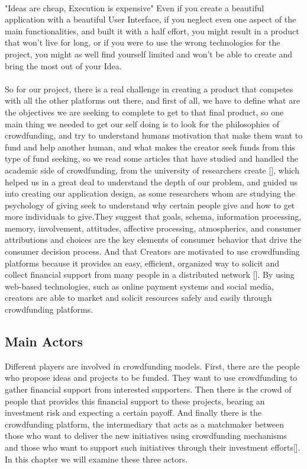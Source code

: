 \paragraph*{}
"Ideas are cheap, Execution is expensive" Even if you create a beautiful application with a beautiful User Interface, if you neglect even one aspect of the main functionalities, and built it with a half effort, you might result in a product that won't live for long, or if you were to use the wrong technologies for the project, you might as well find yourself limited and won't be able to create and bring the most out of your Idea.
\paragraph*{}
So for our project, there is a real challenge in creating a product that competes with all the other platforms out there,
and first of all, we have to define what are the objectives we are seeking to complete to get to that final product,
so one main thing we needed to get our self doing is to look for the philosophies of crowdfunding, and try to understand humans motivation that make them want to fund and help another human, and what makes the creator seek funds from this type of fund seeking,
so we read some articles that have studied and handled the academic side of crowdfunding, from the university of  researchers create [\cite{inproceedings}], which helped us in a great deal to understand the depth of our problem, and guided us into creating our application design, as some researchers whom are studying the psychology of giving seek to understand why certain people give and how to get more individuals to give.They suggest that goals, schema, information processing, memory, involvement, attitudes, affective processing, atmospherics, and consumer attributions and choices are the key elements of consumer behavior that drive the consumer decision process.
And that Creators are motivated to use crowdfunding platforms because it provides an easy, efficient, organized way to solicit and collect financial support from many people in a distributed network [\cite{crowdMotiv}]. By using web-based technologies, such as online payment systems and social media, creators are able to market and solicit resources safely and easily through crowdfunding platforms.
\\
\subsection{Main Actors}
Different players are involved in crowdfunding models. First, there are the people who propose ideas and
projects to be funded. They want to use crowdfunding to gather financial support from interested supporters.
Then there is the crowd of people that provides this financial support to these projects, bearing an investment
risk and expecting a certain payoff. And finally there is the crowdfunding platform, the intermediary that acts
as a matchmaker between those who want to deliver the new initiatives using crowdfunding mechanisms
and those who want to support such initiatives through their investment efforts[\cite{crwdfun:transform}]. In this chapter we will
examine these three actors.
